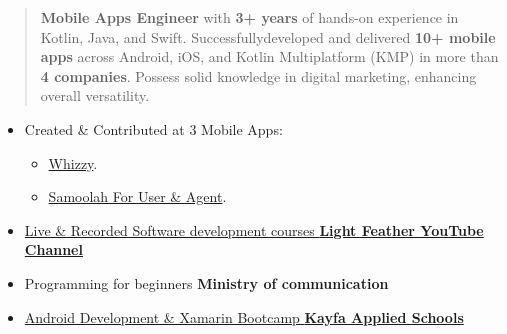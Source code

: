 \documentclass[10pt,a4paper,ragged2e,withhyper]{altacv}
\begin{document}

    \makecvheader


    \begin{quote}

        \textbf{Mobile Apps Engineer}  with \textbf{3+ years} of hands-on experience in Kotlin, Java, and Swift.
        Successfully\linebreak developed and delivered \textbf{10+ mobile apps} across Android, iOS, and Kotlin Multiplatform (KMP) in more than \textbf{4 companies}.
        Possess solid knowledge in digital marketing, enhancing overall versatility.

    \end{quote}



    \begin{itemize}
        \item Created \& Contributed at 3 Mobile Apps:
        \begin{itemize}
            \item \hyperlink{whizzy}{Whizzy}.
            \item \hyperlink{samoolah}{Samoolah For User \& Agent}.
        \end{itemize}
    \end{itemize}
    \divider

    \begin{itemize}
        \item  \href{https://www.youtube.com/c/LightFeather42}{Live \& Recorded Software development courses \hspace{3.9em} \textcolor{TertiaryColor}{\textbf{Light Feather YouTube Channel}}}
        \item  Programming for beginners \textcolor{TertiaryColor}{\hspace{13.1em}\textbf{Ministry of communication}}
        \item  \href{https://www.linkedin.com/company/kayfa-juniors-%D9%83%D9%8A%D9%81-%D8%AC%D9%88%D9%86%D9%8A%D9%88%D8%B1%D8%B2/}{Android Development \& Xamarin Bootcamp \textcolor{TertiaryColor}{\hspace{5.8em}\textbf{Kayfa Applied Schools}} }

    \end{itemize}
    \divider
\end{document}
